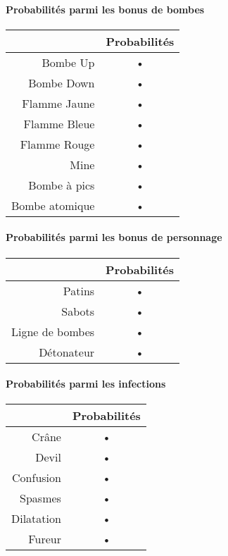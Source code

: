 \paragraph{Probabilités parmi les bonus de bombes}
\begin{center}
\begin{tabular}{|r|c|}
\hline 
& Probabilités \\ 
\hline 
Bombe Up & • \\ 
\hline 
Bombe Down & • \\ 
\hline 
Flamme Jaune & • \\ 
\hline 
Flamme Bleue & • \\ 
\hline 
Flamme Rouge & • \\ 
\hline 
Mine & • \\ 
\hline 
Bombe à pics & • \\ 
\hline 
Bombe atomique & • \\ 
\hline 
\end{tabular} 
\end{center}

\paragraph{Probabilités parmi les bonus de personnage}
\begin{center}
\begin{tabular}{|r|c|}
\hline 
& Probabilités \\ 
\hline 
Patins & • \\ 
\hline 
Sabots & • \\ 
\hline 
Ligne de bombes & • \\ 
\hline 
Détonateur & • \\ 
\hline 
\end{tabular} 
\end{center}

\paragraph{Probabilités parmi les infections}
\begin{center}
\begin{tabular}{|r|c|}
\hline 
& Probabilités \\ 
\hline 
Crâne & • \\ 
\hline 
Devil & • \\ 
\hline 
Confusion & • \\ 
\hline 
Spasmes & • \\ 
\hline 
Dilatation & • \\ 
\hline 
Fureur & • \\ 
\hline 
\end{tabular} 
\end{center}